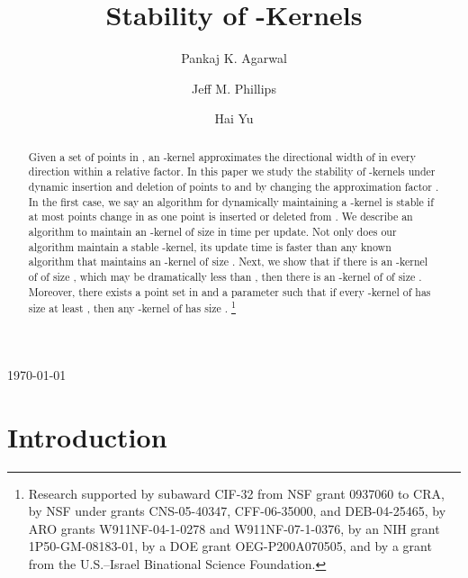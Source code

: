 \documentclass[11pt]{myclass}
\title{Stability of -Kernels}
\author{Pankaj K. Agarwal\and 
Jeff M. Phillips\and 
Hai Yu}
\begin{document}
\begin{titlepage}
\maketitle

\begin{center} \today \end{center}

\begin{abstract}
Given a set  of  points in , an -kernel  
approximates the directional width of  in every direction within a relative 
 factor.  In this paper we study the stability of 
-kernels under dynamic insertion and deletion of points to  and by changing the approximation factor .
In the first case, we say an algorithm for dynamically
maintaining a -kernel is stable if at most  points
change in  as one point is inserted or deleted from .
We describe an algorithm to maintain an -kernel of 
size  in  
time per update.  Not only does our algorithm maintain a
stable -kernel, its update time is faster than any known
algorithm that maintains an -kernel of size
. 
Next, we show that if there is an -kernel of  of
size , which may be dramatically less than 
, then there is 
an -kernel of  of size 
.
Moreover, 
there exists a point set  in  and a parameter
 such that if every -kernel of  has size at
least , then any -kernel of  has size 
.
\footnote{Research supported by 
    subaward CIF-32 from NSF grant 0937060 to CRA, 
    by NSF under grants
    CNS-05-40347, CFF-06-35000, and DEB-04-25465, by ARO grants
    W911NF-04-1-0278 and W911NF-07-1-0376, by an NIH grant
    1P50-GM-08183-01, by a DOE grant OEG-P200A070505, and by a grant
    from the U.S.--Israel Binational Science Foundation.}
\end{abstract}
\end{titlepage}






\section{Introduction}
\label{sec:intro}
\end{document}
